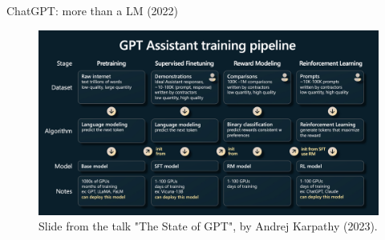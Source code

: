 \documentclass[9pt]{beamer}
\begin{document}
\begin{frame}{ChatGPT: more than a LM (2022)}
    \begin{figure}
        \centering
        \includegraphics[width=\textwidth]{img/gpt-assistant-pipeline.png}
        \caption{Slide from the talk "The State of GPT", by Andrej Karpathy (2023).}
        \label{fig:enter-label}
    \end{figure}
\end{frame}
\end{document}
